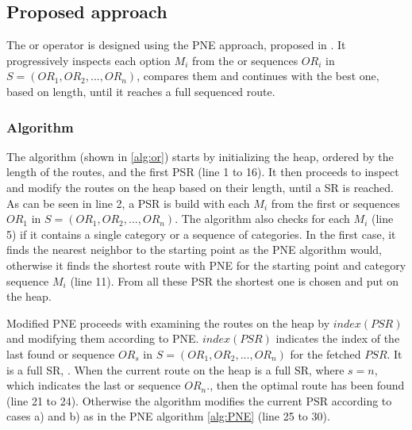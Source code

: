 \subsection{Proposed approach} 
\label{sec:approachOr}
The or operator is designed using the PNE approach, proposed in \cite{OSR}. It progressively inspects each option $M_i$ from the or sequences $OR_i$ in $S = (OR_1, OR_2, ..., OR_n)$, compares them and continues with the best one, based on length, until it reaches a full sequenced route.

\subsubsection{Algorithm}
\label{sec:algortihmOr}
The algorithm (shown in \ref{alg:or}) starts by initializing the heap, ordered by the length of the routes, and the first PSR (line 1 to 16). It then proceeds to inspect and modify the routes on the heap based on their length, until a SR is reached. As can be seen in line 2, a PSR is build with each $M_i$ from the first or sequences $OR_1$ in $S = (OR_1, OR_2, ..., OR_n)$. The algorithm also checks for each $M_i$ (line 5) if it contains a single category or a sequence of categories. In the first case, it finds the nearest neighbor to the starting point as the PNE algorithm would, otherwise it finds the shortest route with PNE for the starting point and category sequence $M_i$ (line 11). From all these PSR the shortest one is chosen and put on the heap.

Modified PNE proceeds with examining the routes on the heap by $index(PSR)$ and modifying them according to PNE. $index(PSR)$ indicates the index of the last found or sequence $OR_s$ in $S = (OR_1, OR_2, ..., OR_n)$ for the fetched $PSR$. It is a full SR, . When the current route on the heap is a full SR, where $s = n$, which indicates the last or sequence $OR_n.$, then the optimal route has been found (line 21 to 24). Otherwise the algorithm modifies the current PSR according to cases a) and b) as in the PNE algorithm \ref{alg:PNE} (line 25 to 30). \newline

